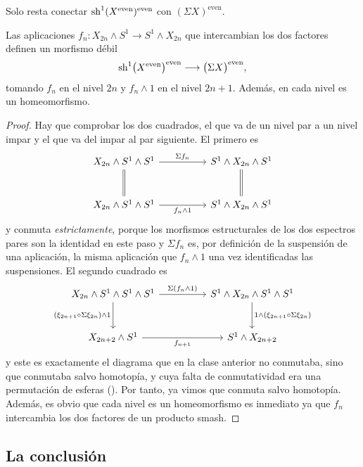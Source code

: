 Solo resta conectar $\operatorname{sh}^1(X^{\mathrm{even}})^{\mathrm{even}}$ con $(\Sigma X)^{\text{even}}$.

\begin{prop}\label{prop:debil-pares}
Las aplicaciones $f_n\colon X_{2n}\wedge S^1\to S^1\wedge X_{2n}$ que intercambian los dos factores definen un morfismo débil
\[
\operatorname{sh}^1\bigl(X^{\mathrm{even}}\bigr)^{\mathrm{even}}\longrightarrow\bigl(\Sigma X\bigr)^{\mathrm{even}},
\]
tomando $f_n$ en el nivel $2n$ y $f_n\wedge1$ en el nivel $2n+1$. Además, en cada nivel es un homeomorfismo.
\end{prop}

\begin{proof}
Hay que comprobar los dos cuadrados, el que va de un nivel par a un nivel impar y el que va del impar al par siguiente. El primero es
\[
\begin{tikzcd}[column sep=huge, row sep=large]
X_{2n}\wedge S^1\wedge S^1 \arrow[r,"\Sigma f_n"] \arrow[d,equal] & S^1\wedge X_{2n}\wedge S^1 \arrow[d,equal]\\
X_{2n}\wedge S^1\wedge S^1 \arrow[r,"f_n\wedge1"'] & S^1\wedge X_{2n}\wedge S^1
\end{tikzcd}
\]
y conmuta \emph{estrictamente}, porque los morfismos estructurales de los dos espectros pares son la identidad en este paso y $\Sigma f_n$ es, por definición de la suspensión de una aplicación, la misma aplicación que $f_n\wedge1$ una vez identificadas las suspensiones. El segundo cuadrado es
\[
\begin{tikzcd}[column sep=huge, row sep=large]
X_{2n}\wedge S^1\wedge S^1\wedge S^1 \arrow[r,"\Sigma(f_n\wedge1)"] \arrow[d,"(\xi_{2n+1}\circ\Sigma\xi_{2n})\wedge1"'] & S^1\wedge X_{2n}\wedge S^1\wedge S^1 \arrow[d,"1\wedge(\xi_{2n+1}\circ\Sigma\xi_{2n})"]\\
X_{2n+2}\wedge S^1 \arrow[r,"f_{n+1}"'] & S^1\wedge X_{2n+2}
\end{tikzcd}
\]
y este es exactamente el diagrama que en la clase anterior no conmutaba, sino que conmutaba salvo homotopía, y cuya falta de conmutatividad era una permutación de esferas (). Por tanto, ya vimos que conmuta salvo homotopía.
Además, es obvio que cada nivel es un homeomorfismo es inmediato ya que $f_n$ intercambia los dos factores de un producto smash.
\end{proof}

\subsection{La conclusión}

